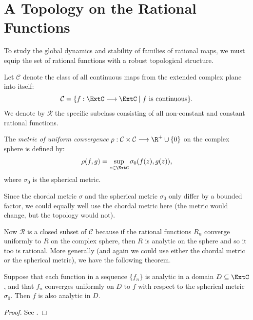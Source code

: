 \section{A Topology on the Rational Functions}

To study the global dynamics and stability of families of rational maps, we must
equip the set of rational functions with a robust topological structure.

\begin{definition}
    Let $\mathcal{C}$ denote the class of all continuous maps from the extended
    complex plane into itself:
    \[
        \mathcal{C} = \{ f : \ExtC \longrightarrow \ExtC \mid f \text{ is continuous} \}.
    \]
    We denote by $\mathcal{R}$ the specific subclass consisting of all
    non-constant and constant rational functions.
\end{definition}

\begin{definition}
    The \emph{metric of uniform convergence} $\rho : \mathcal{C} \times
    \mathcal{C} \longrightarrow \R^+ \cup \{0\}$ on the complex sphere is
    defined by:
    \[
        \rho(f, g) = \sup_{z \in \ExtC} \sigma_0(f(z), g(z)),
    \]
    where $\sigma_0$ is the spherical metric.
\end{definition}

Since the chordal metric $\sigma$ and the spherical metric $\sigma_0$ only
differ by a bounded factor, we could equally well use the chordal metric here
(the metric would change, but the topology would not).

Now $\mathcal{R}$ is a closed subset of $\mathcal{C}$ because if the rational
functions $R_n$ converge uniformly to $R$ on the complex sphere, then $R$ is
analytic on the sphere and so it too is rational. More generally (and again we
could use either the chordal metric or the spherical metric), we have the
following theorem.

\begin{theorem}
    Suppose that each function in a sequence $\{f_n\}$ is analytic in a domain
    $D \subseteq \ExtC$, and that $f_n$ converges uniformly on $D$ to $f$ with
    respect to the spherical metric $\sigma_0$. Then $f$ is also analytic in
    $D$.
\end{theorem}
\begin{proof}
    See \cite[46]{Beardon1991}.
\end{proof}

